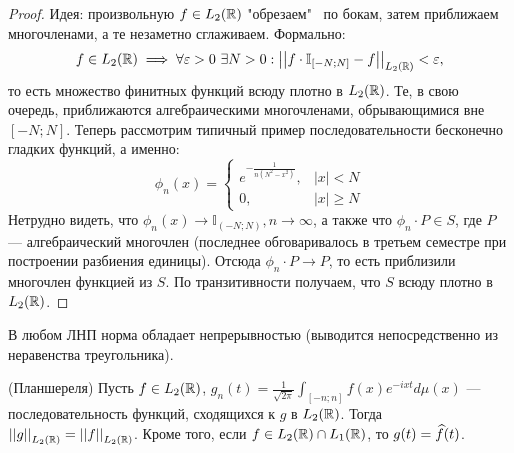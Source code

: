 \begin{proof}
	Идея: произвольную $f \in L_2(\mathbb{R})$ "обрезаем" \ по бокам, затем приближаем многочленами, а те незаметно сглаживаем. Формально:
	\[
		f \in L_2(\mathbb{R}) \implies \forall \varepsilon > 0 \ \exists N > 0: \left|\left|f \cdot \mathbb{I}_{[-N; N]} - f\right|\right|_{L_2(\mathbb{R})} < \varepsilon,
	\]
	то есть множество финитных функций всюду плотно в $L_2(\mathbb{R})$. Те, в свою очередь, приближаются алгебраическими многочленами, обрывающимися вне $[-N; N]$. Теперь рассмотрим типичный пример последовательности бесконечно гладких функций, а именно:
	\[
		\phi_n(x) = \begin{cases*}
			e^{-\frac{1}{n(N^2 - x^2)}}, & |x| < N \\
			0, & |x| \geq N
		\end{cases*}
	\]
	Нетрудно видеть, что $\phi_n(x) \to \mathbb{I}_{(-N; N)}, n \to \infty$, а также что $\phi_n \cdot P \in S$, где $P$ --- алгебраический многочлен (последнее обговаривалось в третьем семестре при построении разбиения единицы). Отсюда $\phi_n \cdot P \to P$, то есть приблизили многочлен функцией из $S$. По транзитивности получаем, что $S$ всюду плотно в $L_2(\mathbb{R})$.
\end{proof}

\begin{note}
	В любом ЛНП норма обладает непрерывностью (выводится непосредственно из неравенства треугольника).
\end{note}

\begin{theorem} (Планшереля)
	Пусть $f \in L_2(\mathbb{R})$, $g_n(t) = \frac{1}{\sqrt{2\pi}} \int_{[-n; n]} f(x) e^{-ixt} d\mu(x)$ --- последовательность функций, сходящихся к $g$ в $L_2(\mathbb{R})$. Тогда $\left|\left|g\right|\right|_{L_2(\mathbb{R})} = \left|\left|f\right|\right|_{L_2(\mathbb{R})}$. Кроме того, если $f \in L_2(\mathbb{R}) \cap L_1(\mathbb{R})$, то $g(t) = \widehat f(t)$.
\end{theorem}

